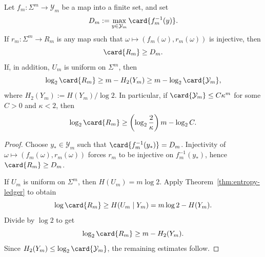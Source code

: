 \begin{corollary}
\label{thm:register-lower-bound}
Let \(f_m:\Sigma^m\to \mathcal{Y}_m\) be a map into a finite set, and set
\[
  D_m:=\max_{y\in \mathcal{Y}_m}\card{f_m^{-1}(y)}.
\]
If \(r_m:\Sigma^m\to R_m\) is any map such that
\(\omega\mapsto(f_m(\omega),r_m(\omega))\) is injective, then
\[
  \card{R_m}\geq D_m.
\]
If, in addition, \(U_m\) is uniform on \(\Sigma^m\), then
\[
  \log_2\card{R_m}
  \geq m-H_2(Y_m)\geq m-\log_2\card{\mathcal{Y}_m},
\]
where \(H_2(Y_m):=H(Y_m)/\log 2\).  In particular, if
\(\card{\mathcal{Y}_m}\leq C\kappa^m\) for some \(C>0\) and
\(\kappa<2\), then
\[
  \log_2\card{R_m}
  \geq \left(\log_2\frac{2}{\kappa}\right)m-\log_2 C.
\]
\end{corollary}

\begin{proof}
Choose \(y_\ast\in \mathcal{Y}_m\) such that
\(\card{f_m^{-1}(y_\ast)}=D_m\).  Injectivity of
\(\omega\mapsto(f_m(\omega),r_m(\omega))\) forces \(r_m\) to be
injective on \(f_m^{-1}(y_\ast)\), hence \(\card{R_m}\geq D_m\).

If \(U_m\) is uniform on \(\Sigma^m\), then \(H(U_m)=m\log 2\).  Apply
Theorem~\ref{thm:entropy-ledger} to obtain
\[
  \log\card{R_m}\geq H(U_m\mid Y_m)=m\log 2-H(Y_m).
\]
Divide by \(\log 2\) to get
\[
  \log_2\card{R_m}\geq m-H_2(Y_m).
\]
Since \(H_2(Y_m)\leq \log_2\card{\mathcal{Y}_m}\), the remaining
estimates follow.
\end{proof}

